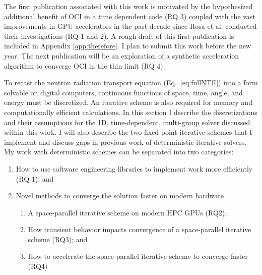 The first publication associated with this work is motivated by the hypothesized additional benefit of OCI in a time dependent code (RQ 3) coupled with the vast improvements in GPU accelerators in the past decade since Rosa et al. \cite{rosa_cellwise_2013} conducted their investigations (RQ 1 and 2).
A rough draft of this first publication is included in Appendix \ref{app:therefore}.
I plan to submit this work before the new year.
The next publication will be an exploration of a synthetic acceleration algorithm to converge OCI in the thin limit (RQ 4).

To recast the neutron radiation transport equation (Eq.~\eqref{eq:fullNTE}) into a form solvable on digital computers, continuous functions of space, time, angle, and energy must be discretized.
An iterative scheme is also required for memory and computationally efficient calculations.
In this section I describe the discretizations and their assumptions for the 1D, time-dependent, multi-group solver discussed within this work.
I will also describe the two fixed-point iterative schemes that I implement and discuss gaps in previous work of deterministic iterative solvers.
My work with deterministic schemes can be separated into two categories:
\begin{enumerate}
    \item How to use software engineering libraries to implement work more efficiently (RQ 1); and
    \item Novel methods to converge the solution faster on modern hardware
    \begin{enumerate}
        \item A space-parallel iterative scheme on modern HPC GPUs (RQ2);
        \item How transient behavior impacts convergence of a space-parallel iterative scheme (RQ3); and
        \item How to accelerate the space-parallel iterative scheme to converge faster (RQ4)
    \end{enumerate}
\end{enumerate}

